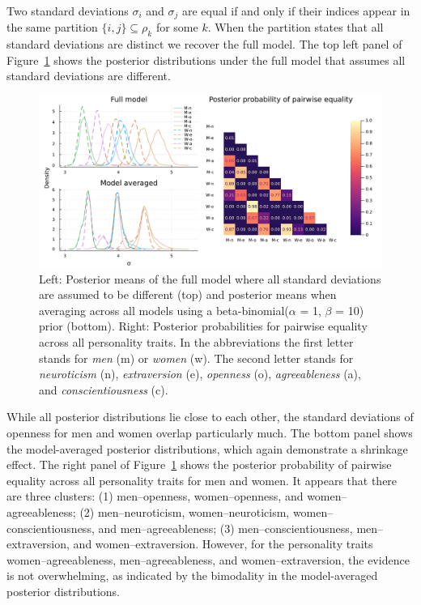 \documentclass[11pt,a4paper]{article}
\theoremstyle{definition} %
\theoremstyle{case}
\newcommand{\partition}{\rho}
\begin{document}
Two standard deviations $\sigma_i$ and $\sigma_j$ are equal if and only if their indices appear in the same partition $\{i,j\}\subseteq\partition_k$ for some $k$.
When the partition states that all standard deviations are distinct we recover the full model. %
The top left panel of Figure~\ref{fig:demo_variances} shows the posterior distributions under the full model that assumes all standard deviations are different.
\begin{figure}
    \centering
    \includegraphics[width=\textwidth]{figures/demo_variances_2panel_plot.pdf}
    \caption{Left: Posterior means of the full model where all standard deviations are assumed to be different (top) and posterior means when averaging across all models using a beta-binomial($\alpha$ = 1, $\beta$ = 10) prior (bottom).
    Right: Posterior probabilities for pairwise equality across all personality traits. In the abbreviations the first letter stands for \emph{men} (m) or \emph{women} (w). The second letter stands for \emph{neuroticism} (n), \emph{extraversion} (e), \emph{openness} (o), \emph{agreeableness} (a), and \emph{conscientiousness} (c).}
    \label{fig:demo_variances}
\end{figure}

While all posterior distributions lie close to each other, the standard deviations of openness for men and women overlap particularly much. The bottom panel shows the model-averaged posterior distributions, which again demonstrate a shrinkage effect. The right panel of Figure~\ref{fig:demo_variances} shows the posterior probability of pairwise equality across all personality traits for men and women. It appears that there are three clusters: (1) men--openness, women--openness, and women--agreeableness; (2) men--neuroticism, women--neuroticism, women--conscientiousness, and men--agreeableness; (3) men--conscientiousness, men--extraversion, and women--extraversion. However, for the personality traits women--agreeableness, men--agreeableness, and women--extraversion, the evidence is not overwhelming, as indicated by the bimodality in the model-averaged posterior distributions.
\end{document}
